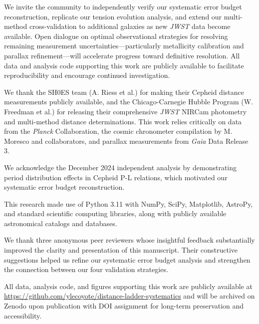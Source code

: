 \documentclass[twocolumn, linenumbers]{aastex701}
\begin{document}
We invite the community to independently verify our systematic error budget reconstruction, replicate our tension evolution analysis, and extend our multi-method cross-validation to additional galaxies as new \textit{JWST} data become available. Open dialogue on optimal observational strategies for resolving remaining measurement uncertainties---particularly metallicity calibration and parallax refinement---will accelerate progress toward definitive resolution. All data and analysis code supporting this work are publicly available to facilitate reproducibility and encourage continued investigation.


\begin{acknowledgments}
We thank the SH0ES team (A. Riess et al.) for making their Cepheid distance measurements publicly available, and the Chicago-Carnegie Hubble Program (W. Freedman et al.) for releasing their comprehensive \textit{JWST} NIRCam photometry and multi-method distance determinations. This work relies critically on data from the \textit{Planck} Collaboration, the cosmic chronometer compilation by M. Moresco and collaborators, and parallax measurements from \textit{Gaia} Data Release 3.

We acknowledge the December 2024 independent analysis by \citet{Anderson2024} demonstrating period distribution effects in Cepheid P-L relations, which motivated our systematic error budget reconstruction.

This research made use of Python 3.11 with NumPy, SciPy, Matplotlib, AstroPy, and standard scientific computing libraries, along with publicly available astronomical catalogs and databases.

We thank three anonymous peer reviewers whose insightful feedback substantially improved the clarity and presentation of this manuscript. Their constructive suggestions helped us refine our systematic error budget analysis and strengthen the connection between our four validation strategies.

All data, analysis code, and figures supporting this work are publicly available at \url{https://github.com/ylecoyote/distance-ladder-systematics} and will be archived on Zenodo upon publication with DOI assignment for long-term preservation and accessibility.
\end{acknowledgments}
\end{document}
